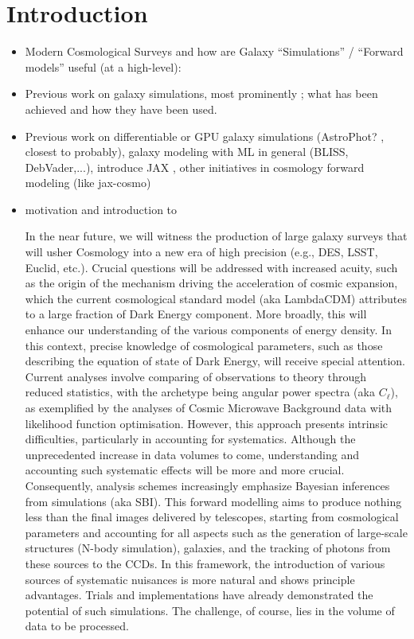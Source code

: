 \documentclass[twocolumn,twocolappendix]{openjournal}
\begin{document}
\section{Introduction} \label{sec:intro}

\begin{itemize}
    \item Modern Cosmological Surveys and how are Galaxy ``Simulations'' / ``Forward models'' useful (at a high-level): 
    
   
    
    \item Previous work on galaxy simulations, most prominently \galsim \citep{galsim2015}; what has been achieved and how they have been used.
    
    \item Previous work on differentiable or GPU galaxy simulations (AstroPhot? \cite{astrophot2023}, closest to \jgalsim probably), galaxy modeling with ML in general (BLISS, DebVader,...), introduce JAX \citep{jax2018github}, other initiatives in cosmology forward modeling (like jax-cosmo)
    
    \item motivation and introduction to \jgalsim 
    
    
In the near future, we will witness the production of large galaxy surveys that will usher Cosmology into a new era of high precision (e.g., DES, LSST, Euclid, etc.). Crucial questions will be addressed with increased acuity, such as the origin of the mechanism driving the acceleration of cosmic expansion, which the current cosmological standard model (aka LambdaCDM) attributes to a large fraction of Dark Energy component. More broadly, this will enhance our understanding of the various components of energy density. In this context, precise knowledge of cosmological parameters, such as those describing the equation of state of Dark Energy, will receive special attention. Current analyses involve comparing of observations to theory through reduced statistics, with the archetype being angular power spectra (aka $C_\ell$), as exemplified by the analyses of Cosmic Microwave Background data with likelihood function optimisation. However, this approach presents intrinsic difficulties, particularly in accounting for systematics. Although the unprecedented increase in data volumes to come, understanding and accounting such systematic effects will be more and more crucial. Consequently, analysis schemes increasingly emphasize Bayesian inferences from simulations (aka SBI). This forward modelling aims to produce nothing less than the final images delivered by telescopes, starting from cosmological parameters and accounting for all aspects such as the generation of large-scale structures (N-body simulation), galaxies, and the tracking of photons from these sources to the CCDs. In this framework, the introduction of various sources of systematic nuisances is more natural and shows principle advantages. Trials and implementations have already demonstrated the potential of such simulations. The challenge, of course, lies in the volume of data to be processed. 


\end{itemize}
\end{document}

